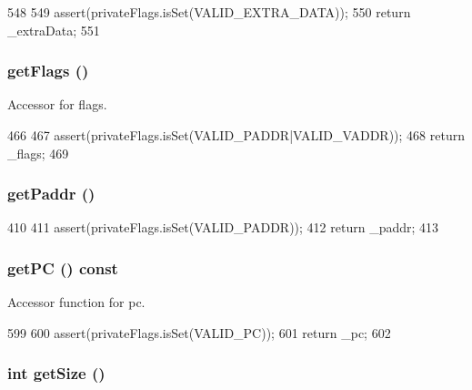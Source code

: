 \begin{DoxyCode}
548     {
549         assert(privateFlags.isSet(VALID_EXTRA_DATA));
550         return _extraData;
551     }
\end{DoxyCode}
\hypertarget{classRequest_a8552aa8d45c9ba10449d51ac08e7d490}{
\subsubsection[{getFlags}]{ getFlags ()}}
\label{classRequest_a8552aa8d45c9ba10449d51ac08e7d490}
Accessor for flags. 


\begin{DoxyCode}
466     {
467         assert(privateFlags.isSet(VALID_PADDR|VALID_VADDR));
468         return _flags;
469     }
\end{DoxyCode}
\hypertarget{classRequest_a744ef11a5afe9d3651ce5f954259cb43}{
\subsubsection[{getPaddr}]{ getPaddr ()}}
\label{classRequest_a744ef11a5afe9d3651ce5f954259cb43}



\begin{DoxyCode}
410     {
411         assert(privateFlags.isSet(VALID_PADDR));
412         return _paddr;
413     }
\end{DoxyCode}
\hypertarget{classRequest_ab651e5db13fd546a5d4f88d3a4a04428}{
\subsubsection[{getPC}]{ getPC () const}}
\label{classRequest_ab651e5db13fd546a5d4f88d3a4a04428}
Accessor function for pc. 


\begin{DoxyCode}
599     {
600         assert(privateFlags.isSet(VALID_PC));
601         return _pc;
602     }
\end{DoxyCode}
\hypertarget{classRequest_a3c4029b904a61a9873e6d12785ce19a1}{
\subsubsection[{getSize}]{\setlength{\rightskip}{0pt plus 5cm}int getSize ()}}
\label{classRequest_a3c4029b904a61a9873e6d12785ce19a1}



